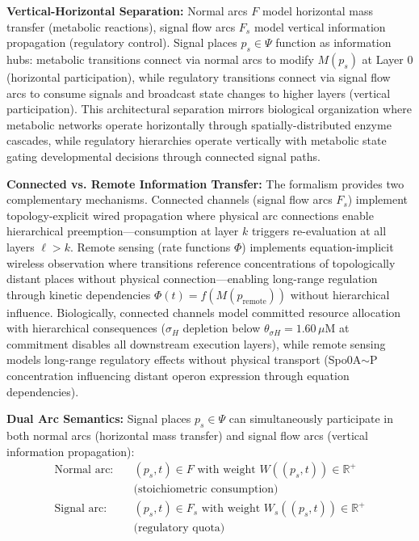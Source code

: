 \documentclass[10pt,letterpaper]{article}
\begin{document}
\textbf{Vertical-Horizontal Separation:} Normal arcs $F$ model horizontal mass transfer (metabolic reactions), signal flow arcs $F_s$ model vertical information propagation (regulatory control). Signal places $p_s \in \Psi$ function as information hubs: metabolic transitions connect via normal arcs to modify $M(p_s)$ at Layer 0 (horizontal participation), while regulatory transitions connect via signal flow arcs to consume signals and broadcast state changes to higher layers (vertical participation). This architectural separation mirrors biological organization where metabolic networks operate horizontally through spatially-distributed enzyme cascades, while regulatory hierarchies operate vertically with metabolic state gating developmental decisions through connected signal paths.

\textbf{Connected vs. Remote Information Transfer:} The formalism provides two complementary mechanisms. Connected channels (signal flow arcs $F_s$) implement topology-explicit wired propagation where physical arc connections enable hierarchical preemption---consumption at layer $k$ triggers re-evaluation at all layers $\ell > k$. Remote sensing (rate functions $\Phi$) implements equation-implicit wireless observation where transitions reference concentrations of topologically distant places without physical connection---enabling long-range regulation through kinetic dependencies $\Phi(t) = f(M(p_{\text{remote}}))$ without hierarchical influence. Biologically, connected channels model committed resource allocation with hierarchical consequences ($\sigma_H$ depletion below $\theta_{\sigma H} = 1.60\,\mu$M at commitment disables all downstream execution layers), while remote sensing models long-range regulatory effects without physical transport (Spo0A$\sim$P concentration influencing distant operon expression through equation dependencies).

\textbf{Dual Arc Semantics:} Signal places $p_s \in \Psi$ can simultaneously participate in both normal arcs (horizontal mass transfer) and signal flow arcs (vertical information propagation):
\begin{align}
\text{Normal arc}: &\quad (p_s, t) \in F \text{ with weight } W((p_s,t)) \in \mathbb{R}^+ \nonumber \\
&\quad \text{(stoichiometric consumption)} \\
\text{Signal arc}: &\quad (p_s, t) \in F_s \text{ with weight } W_s((p_s,t)) \in \mathbb{R}^+ \nonumber \\
&\quad \text{(regulatory quota)}
\end{align}
\end{document}
